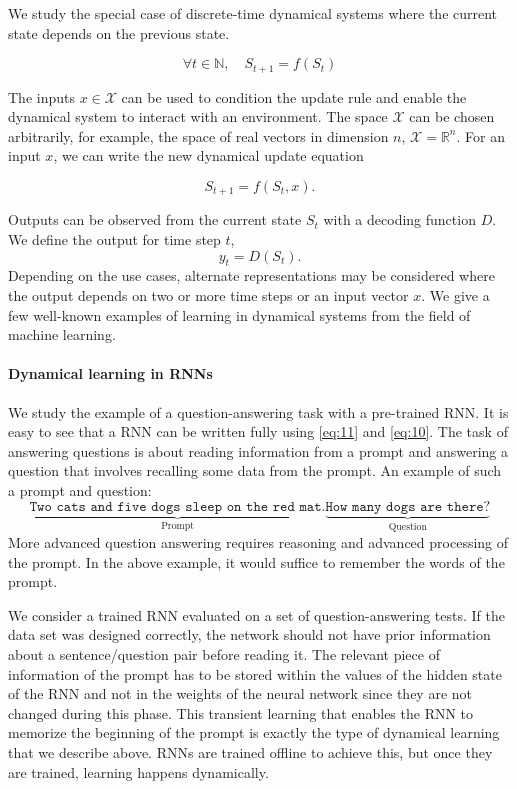 We study the special case of discrete-time dynamical systems where the current
state depends on the previous state.

\begin{equation}
  \forall t \in \mathbb{N},\quad S_{t + 1} = f(S_{t})
  \label{eq:dyn-update}
\end{equation}

The inputs $x \in \mathcal{X}$ can be used to condition the update rule and enable the dynamical system
to interact with an environment. The space $\mathcal{X}$ can be chosen arbitrarily, 
for example, the space of real vectors in dimension $n$, $\mathcal{X} = \mathbb{R}^n$. 
For an input $x$, we can write the new dynamical update equation

\begin{equation}
S_{t+1} = f(S_t, x).
\label{eq:11}
\end{equation}

Outputs can be observed from the current state $S_t$ with a decoding function
$D$. We define the output for time step $t$,
\begin{equation}
  \label{eq:10}
  y_t = D(S_t).
\end{equation}
Depending on the use cases, alternate representations may be considered where
the output depends on two or more time steps or an input vector $x$.
We give a few well-known examples of learning in dynamical systems from the
field of machine learning.

\paragraph{Dynamical learning in \acp{RNN}}\label{sec:dynam-learn-acprnn}
We study the example of a question-answering task with a pre-trained \ac{RNN}.
It is easy to see that a \ac{RNN} can be written fully using \eqref{eq:11} and
\eqref{eq:10}. The task of answering questions is about reading information from
a prompt and answering a question that involves recalling some data from the
prompt. An example of such a prompt and question:
\begin{equation*}
  \underbrace{\texttt{Two cats and five dogs sleep on the red mat.}}_{\text{Prompt}}
  \underbrace{\texttt{How many dogs are there?}}_{\text{Question}}
\end{equation*}
More advanced question answering requires reasoning and advanced processing of
the prompt. In the above example, it would suffice to remember the words of the
prompt.

We consider a trained \ac{RNN} evaluated on a set of question-answering tests.
If the data set was designed correctly, the network should not have prior
information about a sentence/question pair before reading it. The relevant piece
of information of the prompt has to be stored within the values of the hidden
state of the \ac{RNN} and not in the weights of the neural network since they are not changed during this phase. This transient learning that enables the
\ac{RNN} to memorize the beginning of the prompt is exactly the type of
dynamical learning that we describe above. \acp{RNN} are trained offline to
achieve this, but once they are trained, learning happens dynamically.

